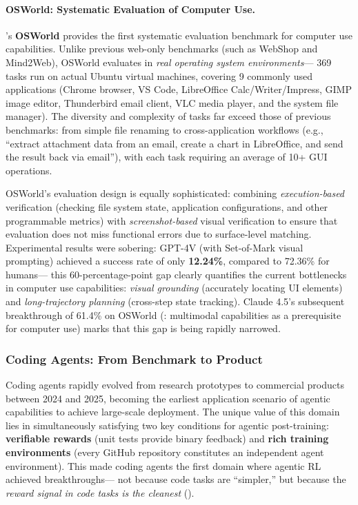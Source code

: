 \paragraph{OSWorld: Systematic Evaluation of Computer Use.}
\citet{xie2024osworld}'s \textbf{OSWorld}
provides the first systematic evaluation benchmark for computer use capabilities.
Unlike previous web-only benchmarks (such as WebShop and Mind2Web),
OSWorld evaluates in \emph{real operating system environments}---
369 tasks run on actual Ubuntu virtual machines,
covering 9 commonly used applications
(Chrome browser, VS Code, LibreOffice Calc/Writer/Impress,
GIMP image editor, Thunderbird email client, VLC media player, and the system file manager).
The diversity and complexity of tasks far exceed those of previous benchmarks:
from simple file renaming to cross-application workflows
(e.g., ``extract attachment data from an email, create a chart in LibreOffice, and send the result back via email''),
with each task requiring an average of 10+ GUI operations.

OSWorld's evaluation design is equally sophisticated:
combining \emph{execution-based} verification (checking file system state, application configurations, and other programmable metrics)
with \emph{screenshot-based} visual verification
to ensure that evaluation does not miss functional errors due to surface-level matching.
Experimental results were sobering:
GPT-4V (with Set-of-Mark visual prompting) achieved a success rate of only \textbf{12.24\%},
compared to 72.36\% for humans---
this 60-percentage-point gap clearly quantifies the current bottlenecks in computer use capabilities:
\emph{visual grounding} (accurately locating UI elements) and \emph{long-trajectory planning} (cross-step state tracking).
Claude 4.5's subsequent breakthrough of 61.4\% on OSWorld
(: multimodal capabilities as a prerequisite for computer use)
marks that this gap is being rapidly narrowed.

\subsubsection{Coding Agents: From Benchmark to Product}

Coding agents rapidly evolved from research prototypes to commercial products between 2024 and 2025,
becoming the earliest application scenario of agentic capabilities to achieve large-scale deployment.
The unique value of this domain lies in simultaneously satisfying two key conditions for agentic post-training:
\textbf{verifiable rewards} (unit tests provide binary feedback)
and \textbf{rich training environments} (every GitHub repository constitutes an independent agent environment).
This made coding agents the first domain where agentic RL achieved breakthroughs---
not because code tasks are ``simpler,''
but because the \emph{reward signal in code tasks is the cleanest}
().

